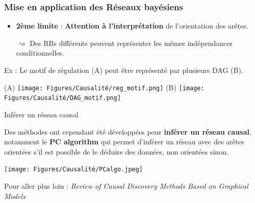 \begin{frame}
   \frametitle{Mise en application des Réseaux bayésiens}
\vfill   
	 \begin{itemize}
\item \textbf{2ème limite} :  \textbf{Attention à l'interprétation} de l'orientation des arêtes.

\vfill
\pause

$\rightsquigarrow$ Des RBs différents peuvent représenter les mêmes indépendances conditionnelles. 

   \end{itemize}

\pause

   Ex : Le motif de régulation (A) peut être représenté par plusieurs DAG (B). 
   
	   \vspace{-0.2cm}

   	  \begin{center}
	    (A) \texttt{[image: Figures/Causalité/reg\_motif.png]}\hspace{1cm}
	    (B) \texttt{[image: Figures/Causalité/DAG\_motif.png]}
	   \end{center}
	   

	 \end{frame}


	\begin{frame}{Inférer un réseau causal}
	
	    Des méthodes ont cependant été développées pour \textbf{inférer un réseau causal}, notamment le \textbf{PC algorithm} qui permet d'inférer un réseau avec des arêtes orientées s'il est possible de le déduire des données, non orientées sinon.
	  
	   
    	   	\begin{center}
    	    \texttt{[image: Figures/Causalité/PCalgo.jpeg]}
    	\end{center}
    	
    	\pause 
    	
	    Pour aller plus loin : \textit{Review of Causal Discovery Methods Based on Graphical Models} \scriptsize \cite{GlymourZhangSpirtes2019}
	    
	    
	\end{frame}
		 


